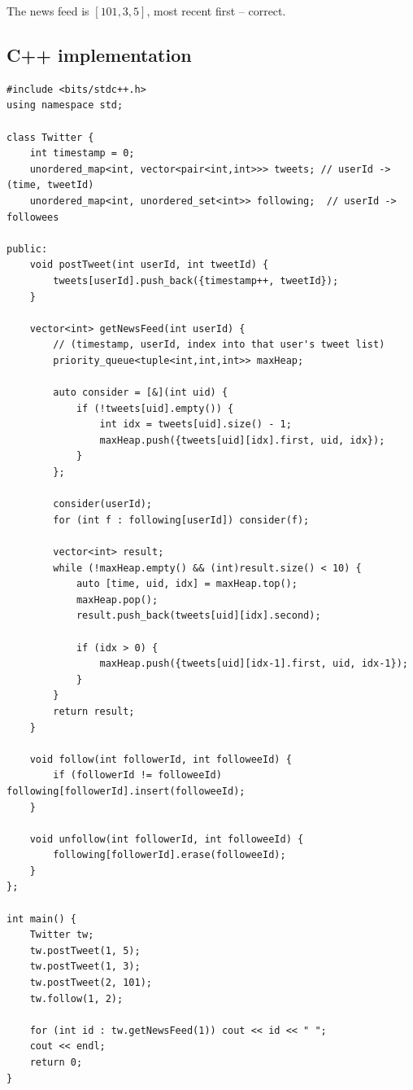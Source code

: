 The news feed is $[101, 3, 5]$, most recent first -- correct.

\subsection*{C++ implementation}

\begin{lstlisting}
#include <bits/stdc++.h>
using namespace std;

class Twitter {
    int timestamp = 0;
    unordered_map<int, vector<pair<int,int>>> tweets; // userId -> (time, tweetId)
    unordered_map<int, unordered_set<int>> following;  // userId -> followees

public:
    void postTweet(int userId, int tweetId) {
        tweets[userId].push_back({timestamp++, tweetId});
    }

    vector<int> getNewsFeed(int userId) {
        // (timestamp, userId, index into that user's tweet list)
        priority_queue<tuple<int,int,int>> maxHeap;

        auto consider = [&](int uid) {
            if (!tweets[uid].empty()) {
                int idx = tweets[uid].size() - 1;
                maxHeap.push({tweets[uid][idx].first, uid, idx});
            }
        };

        consider(userId);
        for (int f : following[userId]) consider(f);

        vector<int> result;
        while (!maxHeap.empty() && (int)result.size() < 10) {
            auto [time, uid, idx] = maxHeap.top();
            maxHeap.pop();
            result.push_back(tweets[uid][idx].second);

            if (idx > 0) {
                maxHeap.push({tweets[uid][idx-1].first, uid, idx-1});
            }
        }
        return result;
    }

    void follow(int followerId, int followeeId) {
        if (followerId != followeeId) following[followerId].insert(followeeId);
    }

    void unfollow(int followerId, int followeeId) {
        following[followerId].erase(followeeId);
    }
};

int main() {
    Twitter tw;
    tw.postTweet(1, 5);
    tw.postTweet(1, 3);
    tw.postTweet(2, 101);
    tw.follow(1, 2);

    for (int id : tw.getNewsFeed(1)) cout << id << " ";
    cout << endl;
    return 0;
}
\end{lstlisting}

